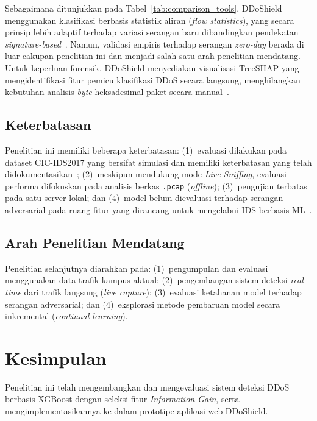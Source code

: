\documentclass[conference,a4paper]{IEEEtran}
\begin{document}
Sebagaimana ditunjukkan pada Tabel~\ref{tab:comparison_tools}, DDoShield menggunakan klasifikasi berbasis statistik aliran (\textit{flow statistics}), yang secara prinsip lebih adaptif terhadap variasi serangan baru dibandingkan pendekatan \textit{signature-based}~\cite{ref_ring2019}. Namun, validasi empiris terhadap serangan \textit{zero-day} berada di luar cakupan penelitian ini dan menjadi salah satu arah penelitian mendatang. Untuk keperluan forensik, DDoShield menyediakan visualisasi TreeSHAP yang mengidentifikasi fitur pemicu klasifikasi DDoS secara langsung, menghilangkan kebutuhan analisis \textit{byte} heksadesimal paket secara manual~\cite{ref_wei2021}.



\subsection{Keterbatasan}

Penelitian ini memiliki beberapa keterbatasan: (1)~evaluasi dilakukan pada dataset CIC-IDS2017 yang bersifat simulasi dan memiliki keterbatasan yang telah didokumentasikan~\cite{ref_engelen2021,ref_alzahrani2021}; (2)~meskipun mendukung mode \textit{Live Sniffing}, evaluasi performa difokuskan pada analisis berkas \texttt{.pcap} (\textit{offline}); (3)~pengujian terbatas pada satu server lokal; dan (4)~model belum dievaluasi terhadap serangan adversarial pada ruang fitur yang dirancang untuk mengelabui IDS berbasis ML~\cite{ref_wu2022}.

\subsection{Arah Penelitian Mendatang}

Penelitian selanjutnya diarahkan pada: (1)~pengumpulan dan evaluasi menggunakan data trafik kampus aktual;
(2)~pengembangan sistem deteksi \textit{real-time} dari trafik langsung (\textit{live capture});
(3)~evaluasi ketahanan model terhadap serangan adversarial; dan (4)~eksplorasi metode pembaruan model
secara inkremental (\textit{continual learning}).


\section{Kesimpulan}
\label{sec:kesimpulan}

Penelitian ini telah mengembangkan dan mengevaluasi sistem deteksi DDoS berbasis XGBoost dengan seleksi fitur
\textit{Information Gain}, serta mengimplementasikannya ke dalam prototipe aplikasi web DDoShield.
\end{document}
